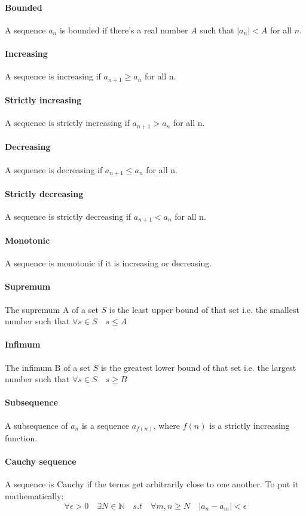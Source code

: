 \documentclass{article}
\newcommand{\N}{\mathbb{N}}
\begin{document}
\paragraph{Bounded}
A sequence $ a_{n} $ is bounded if there's a real number $ A $ such that $ |a_{n}| < A $ for all $ n $.
\paragraph{Increasing}
A sequence is increasing if $ a_{n + 1} \geq a_{n} $ for all n.
\paragraph{Strictly increasing}
A sequence is strictly increasing if $ a_{n + 1} > a_{n} $ for all n.
\paragraph{Decreasing}
A sequence is decreasing if $ a_{n + 1} \leq a_{n} $ for all n.
\paragraph{Strictly decreasing}
A sequence is strictly decreasing if $ a_{n + 1} < a_{n} $ for all n.
\paragraph{Monotonic}
A sequence is monotonic if it is increasing or decreasing.
\paragraph{Supremum}
The supremum A of a set $ S $ is the least upper bound of that set i.e. the smallest number such that $ \forall s \in S \quad s \leq A $
\paragraph{Infimum}
The infimum B of a set $ S $ is the greatest lower bound of that set i.e. the largest number such that $ \forall s \in S \quad s \geq B $
\paragraph{Subsequence}
A subsequence of $ a_{n} $ is a sequence $ a_{f(n)} $, where $ f(n) $ is a strictly increasing function.
\paragraph{Cauchy sequence}
A sequence is Cauchy if the terms get arbitrarily close to one another. To put it mathematically:
\begin{equation}
\forall \epsilon > 0 \quad \exists N \in \N \quad s.t \quad \forall m,n \geq N \quad |a_{n} - a_{m}| < \epsilon
\end{equation}
\end{document}
